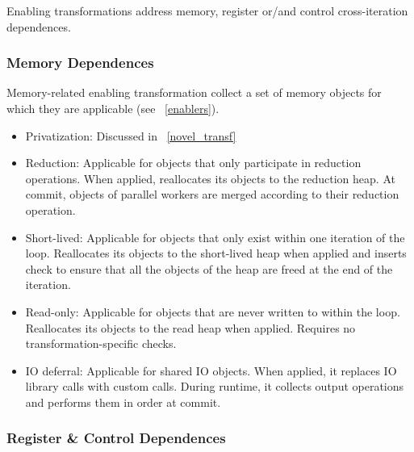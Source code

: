 Enabling transformations address memory, register or/and control
cross-iteration dependences.

\subsubsection{Memory Dependences}

Memory-related enabling transformation collect a set of memory objects
for which they are applicable (see ~\ref{enablers}).


\begin{itemize}
%
\item Privatization: Discussed in ~\ref{novel_transf}

\item Reduction: Applicable for objects that only participate in
reduction operations. When applied, reallocates
its objects to the reduction heap. At commit, objects of parallel
workers are merged according to their reduction operation.




\item Short-lived: Applicable for objects that only exist within one
iteration of the loop. Reallocates its objects to the
short-lived heap when applied and inserts check to ensure that all
the objects of the heap are freed at the end of the iteration.

\item Read-only: Applicable for objects that are never written to within
the loop. Reallocates its objects to the read heap when applied. Requires no
transformation-specific checks.

\item IO deferral: Applicable for shared IO objects. When applied, it
replaces IO library calls with custom calls. During runtime, it
collects output operations and performs them in order at commit.

\end{itemize}

\subsubsection{Register \& Control Dependences}


